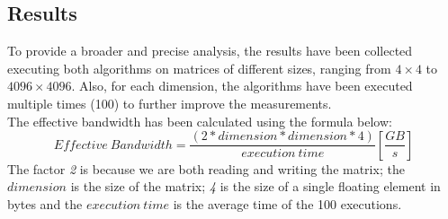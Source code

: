 \documentclass{IEEEconf}
\begin{document}
\subsection{Results}
To provide a broader and precise analysis, the results have been collected executing both algorithms on matrices of different sizes,
ranging from $4 \times 4$ to $4096 \times 4096$. Also, for each dimension, the algorithms have been executed multiple times (100) to further improve the measurements. \\
The effective bandwidth has been calculated using the formula below: \\
\begin{equation*}
    Effective \: Bandwidth = \frac{\left ( \textit{2} * dimension * dimension * \textit{4} \right )}{execution\: time}
    \left[\frac{GB}{s}\right]
\end{equation*}
The factor \textit{2} is because we are both reading and writing the matrix; the $dimension$ is the size of the matrix; 
\textit{4} is the size of a single floating element in bytes and the $execution \: time$ is the average time of the 100 executions. \\
\end{document}
